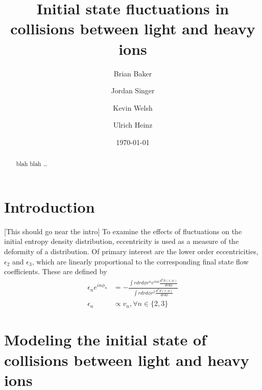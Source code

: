 \documentclass[twocolumn,showpacs,amsfonts,aps,prc,nofootinbib,floatfix]{revtex4}
\begin{document}

\title{Initial state fluctuations in collisions between light and heavy ions} 


\author{Brian Baker}
\author{Jordan Singer}
\author{Kevin Welsh}
\author{Ulrich Heinz}
  
\begin{abstract}
blah blah \dots
\end{abstract}


\date{\today}

\maketitle


\section{Introduction}
\label{sec1}

[This should go near the intro]
To examine the effects of fluctuations on the initial entropy density distribution, eccentricity is used as a measure of the deformity of a distribution. Of primary interest are the lower order eccentricities, $\epsilon_2$ and $\epsilon_3$, which are linearly proportional to the corresponding final state flow coefficients. These are defined by
\begin{align}
\epsilon_n e^{i n\phi_n}& = -\frac{\int r dr d\phi r^n e^{i n \phi} \frac{d^2 S(r,\phi)}{dr d\phi}}{\int r dr d\phi r^2 \frac{d^2 S(r,\phi)}{dr d\phi}}\\
\epsilon_n &\propto v_n, \forall n \in \{2,3\}
\end{align}

\section{Modeling the initial state of collisions between light and heavy ions}
\label{sec2}
\end{document}
